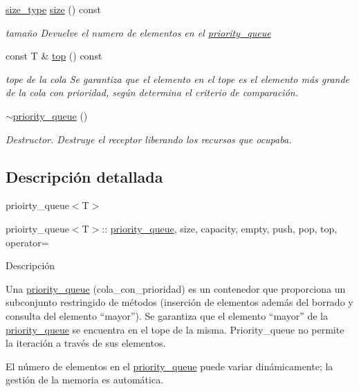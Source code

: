 \begin{DoxyCompactItemize}
\hyperlink{classpriority__queue_ab93fe794e0660e6e882a859f05537ba4}{size\-\_\-type} \hyperlink{classpriority__queue_aa2eac4c0e3bc1f5e138c198236305bf8}{size} () const 
\begin{DoxyCompactList}\small\item\em tamaño \-Devuelve el numero de elementos en el \hyperlink{classpriority__queue}{priority\-\_\-queue} \end{DoxyCompactList}\item 
const \-T \& \hyperlink{classpriority__queue_a26f6bc4aa3c9fca723cd0f084a8e7b78}{top} () const 
\begin{DoxyCompactList}\small\item\em tope de la cola \-Se garantiza que el elemento en el tope es el elemento más grande de la cola con prioridad, según determina el criterio de comparación. \end{DoxyCompactList}\item 
\hyperlink{classpriority__queue_acac385c42d343b59620372f681696d8d}{$\sim$priority\-\_\-queue} ()
\begin{DoxyCompactList}\small\item\em \-Destructor. \-Destruye el receptor liberando los recursos que ocupaba. \end{DoxyCompactList}\end{DoxyCompactItemize}


\subsection{\-Descripción detallada}
prioirty\-\_\-queue$<$\-T$>$

prioirty\-\_\-queue$<$\-T$>$\-:\-: \hyperlink{classpriority__queue}{priority\-\_\-queue}, size, capacity, empty, push, pop, top, operator=

\-Descripción

\-Una \hyperlink{classpriority__queue}{priority\-\_\-queue} (cola\-\_\-con\-\_\-prioridad) es un contenedor que proporciona un subconjunto restringido de métodos (inserción de elementos además del borrado y consulta del elemento “mayor”). \-Se garantiza que el elemento “mayor” de la \hyperlink{classpriority__queue}{priority\-\_\-queue} se encuentra en el tope de la misma. \-Priority\-\_\-queue no permite la iteración a través de sus elementos.

\-El número de elementos en el \hyperlink{classpriority__queue}{priority\-\_\-queue} puede variar dinámicamente; la gestión de la memoria es automática. 

